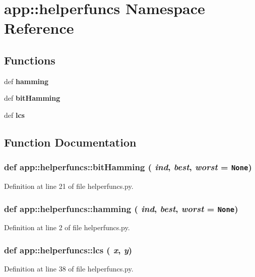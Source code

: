 \section{app::helperfuncs Namespace Reference}
\label{namespaceapp_1_1helperfuncs}


\subsection*{Functions}
\begin{CompactItemize}
\item 
def {\bf hamming}
\item 
def {\bf bitHamming}
\item 
def {\bf lcs}
\end{CompactItemize}


\subsection{Function Documentation}
\subsubsection{\setlength{\rightskip}{0pt plus 5cm}def app::helperfuncs::bitHamming ( {\em ind},  {\em best},  {\em worst} = {\tt None})}\label{namespaceapp_1_1helperfuncs_c51d3af092d88096fe28cba74cdb8014}




Definition at line 21 of file helperfuncs.py.
\subsubsection{\setlength{\rightskip}{0pt plus 5cm}def app::helperfuncs::hamming ( {\em ind},  {\em best},  {\em worst} = {\tt None})}\label{namespaceapp_1_1helperfuncs_1a252e997143658b55ada13a7f27ec8d}




Definition at line 2 of file helperfuncs.py.
\subsubsection{\setlength{\rightskip}{0pt plus 5cm}def app::helperfuncs::lcs ( {\em x},  {\em y})}\label{namespaceapp_1_1helperfuncs_43b619e280646af94cf95bdf8a6a7b52}




Definition at line 38 of file helperfuncs.py.